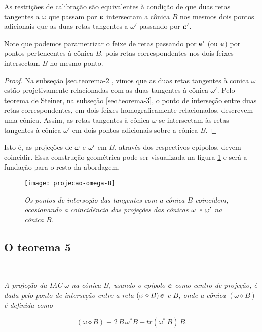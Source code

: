 \begin{teorema}
As restrições de calibração são equivalentes à condição de que duas retas tangentes a $\omega$ que passam por $\boldsymbol{e}$ intersectam a cônica $B$ nos mesmos dois pontos adicionais que as duas retas tangentes a $\omega'$ passando por $\boldsymbol{e}'$.
\end{teorema}

Note que podemos parametrizar o feixe de retas passando por ${\bf e'}$ (ou ${\bf e}$) por pontos pertencentes à cônica $B$, pois retas correspondentes nos dois feixes intersectam $B$ no mesmo ponto. 

\begin{proof}
Na subseção \ref{sec.teorema-2}, vimos que as duas retas tangentes à conica $\omega$ estão projetivamente relacionadas com as duas tangentes à cônica $\omega'$. Pelo teorema de Steiner, na subseção \ref{sec.teorema-3}, o ponto de interseção entre duas retas correspondentes, em dois feixes homograficamente relacionados, descrevem uma cônica. Assim, as retas tangentes à cônica $\omega$ se intersectam às retas tangentes à cônica $\omega'$ em dois pontos adicionais sobre a cônica $B$. 
\end{proof}

Isto é, as projeções de ${\bf \omega}$ e ${\bf \omega'}$ em $B$, através dos respectivos epipolos, devem coincidir. Essa construção geométrica pode ser visualizada na figura \ref{omega-B} e será a fundação para o resto da abordagem. 

\begin{figure}[!htb]
\centering
\texttt{[image: projecao-omega-B]}
\caption{\textit{Os pontos de interseção das tangentes com a cônica $B$ coincidem, ocasionando a coincidência das projeções das cônicas ${\bf \omega}$ e ${\bf \omega'}$ na cônica $B$.}}
\label{omega-B}
\end{figure}

\subsection{O teorema 5}\label{sec.teorema-5}

\,\,\,\,{\it A projeção da IAC $\omega$ na cônica $B$, usando o epipolo $\boldsymbol{e}$ como centro de projeção, é dada pelo ponto de interseção entre a reta $(\omega\diamond B)\,\boldsymbol{e}$ e $B$, onde a cônica $(\omega\diamond B)$ é definida como

\begin{equation*}
(\omega \diamond B)\equiv 2\,B\,\omega^*B - tr(\omega^*\,B)\,B.
\end{equation*}
}



